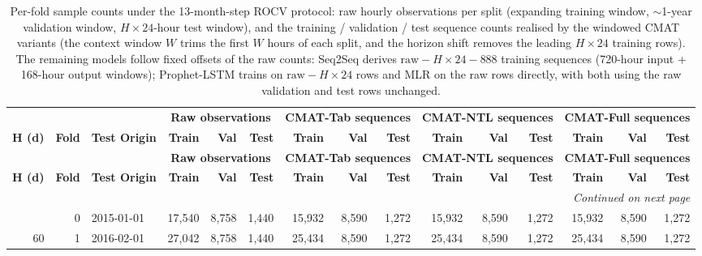 \begingroup\footnotesize\setlength{\tabcolsep}{3pt}
\begin{longtable}{r r l r r r r r r r r r r r r}
\caption{Per-fold sample counts under the 13-month-step ROCV protocol: raw
hourly observations per split (expanding training window, ${\sim}$1-year
validation window, $H \times 24$-hour test window), and the training /
validation / test sequence counts realised by the windowed CMAT variants
(the context window $W$ trims the first $W$ hours of each split, and the
horizon shift removes the leading $H \times 24$ training rows). The remaining
models follow fixed offsets of the raw counts: Seq2Seq derives
$\mathrm{raw} - H{\times}24 - 888$ training sequences (720-hour input +
168-hour output windows); Prophet-LSTM trains on $\mathrm{raw} - H{\times}24$
rows and MLR on the raw rows directly, with both using the raw validation and
test rows unchanged.}
\label{tab:fold_sample_counts} \\
\toprule
 &  &  & \multicolumn{3}{c}{\textbf{Raw observations}} & \multicolumn{3}{c}{\textbf{CMAT-Tab sequences}} & \multicolumn{3}{c}{\textbf{CMAT-NTL sequences}} & \multicolumn{3}{c}{\textbf{CMAT-Full sequences}} \\
\cmidrule(lr){4-6} \cmidrule(lr){7-9} \cmidrule(lr){10-12} \cmidrule(lr){13-15}
\textbf{H (d)} & \textbf{Fold} & \textbf{Test Origin} & \textbf{Train} & \textbf{Val} & \textbf{Test} & \textbf{Train} & \textbf{Val} & \textbf{Test} & \textbf{Train} & \textbf{Val} & \textbf{Test} & \textbf{Train} & \textbf{Val} & \textbf{Test} \\
\midrule
\endfirsthead
\toprule
 &  &  & \multicolumn{3}{c}{\textbf{Raw observations}} & \multicolumn{3}{c}{\textbf{CMAT-Tab sequences}} & \multicolumn{3}{c}{\textbf{CMAT-NTL sequences}} & \multicolumn{3}{c}{\textbf{CMAT-Full sequences}} \\
\cmidrule(lr){4-6} \cmidrule(lr){7-9} \cmidrule(lr){10-12} \cmidrule(lr){13-15}
\textbf{H (d)} & \textbf{Fold} & \textbf{Test Origin} & \textbf{Train} & \textbf{Val} & \textbf{Test} & \textbf{Train} & \textbf{Val} & \textbf{Test} & \textbf{Train} & \textbf{Val} & \textbf{Test} & \textbf{Train} & \textbf{Val} & \textbf{Test} \\
\midrule
\endhead
\midrule
\multicolumn{15}{r}{\textit{Continued on next page}} \\
\endfoot
\bottomrule
\endlastfoot
60 & 0 & 2015-01-01 & 17{,}540 & 8{,}758 & 1{,}440 & 15{,}932 & 8{,}590 & 1{,}272 & 15{,}932 & 8{,}590 & 1{,}272 & 15{,}932 & 8{,}590 & 1{,}272 \\
60 & 1 & 2016-02-01 & 27{,}042 & 8{,}758 & 1{,}440 & 25{,}434 & 8{,}590 & 1{,}272 & 25{,}434 & 8{,}590 & 1{,}272 & 25{,}434 & 8{,}590 & 1{,}272 \\

\end{longtable}
